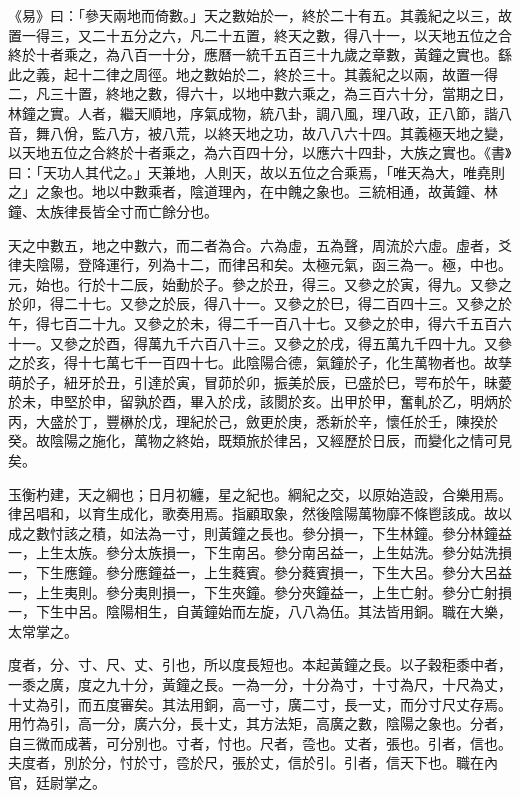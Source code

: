 \begin{pinyinscope}
《易》曰：「參天兩地而倚數。」天之數始於一，終於二十有五。其義紀之以三，故置一得三，又二十五分之六，凡二十五置，終天之數，得八十一，以天地五位之合終於十者乘之，為八百一十分，應曆一統千五百三十九歲之章數，黃鐘之實也。繇此之義，起十二律之周徑。地之數始於二，終於三十。其義紀之以兩，故置一得二，凡三十置，終地之數，得六十，以地中數六乘之，為三百六十分，當期之日，林鐘之實。人者，繼天順地，序氣成物，統八卦，調八風，理八政，正八節，諧八音，舞八佾，監八方，被八荒，以終天地之功，故八八六十四。其義極天地之變，以天地五位之合終於十者乘之，為六百四十分，以應六十四卦，大族之實也。《書》曰：「天功人其代之。」天兼地，人則天，故以五位之合乘焉，「唯天為大，唯堯則之」之象也。地以中數乘者，陰道理內，在中餽之象也。三統相通，故黃鐘、林鐘、太族律長皆全寸而亡餘分也。

天之中數五，地之中數六，而二者為合。六為虛，五為聲，周流於六虛。虛者，爻律夫陰陽，登降運行，列為十二，而律呂和矣。太極元氣，函三為一。極，中也。元，始也。行於十二辰，始動於子。參之於丑，得三。又參之於寅，得九。又參之於卯，得二十七。又參之於辰，得八十一。又參之於巳，得二百四十三。又參之於午，得七百二十九。又參之於未，得二千一百八十七。又參之於申，得六千五百六十一。又參之於酉，得萬九千六百八十三。又參之於戌，得五萬九千四十九。又參之於亥，得十七萬七千一百四十七。此陰陽合德，氣鐘於子，化生萬物者也。故孳萌於子，紐牙於丑，引達於寅，冒茆於卯，振美於辰，已盛於巳，咢布於午，昧薆於未，申堅於申，留孰於酉，畢入於戌，該閡於亥。出甲於甲，奮軋於乙，明炳於丙，大盛於丁，豐楙於戊，理紀於己，斂更於庚，悉新於辛，懷任於壬，陳揆於癸。故陰陽之施化，萬物之終始，既類旅於律呂，又經歷於日辰，而變化之情可見矣。

玉衡杓建，天之綱也；日月初纏，星之紀也。綱紀之交，以原始造設，合樂用焉。律呂唱和，以育生成化，歌奏用焉。指顧取象，然後陰陽萬物靡不條鬯該成。故以成之數忖該之積，如法為一寸，則黃鐘之長也。參分損一，下生林鐘。參分林鐘益一，上生太族。參分太族損一，下生南呂。參分南呂益一，上生姑洗。參分姑洗損一，下生應鐘。參分應鐘益一，上生蕤賓。參分蕤賓損一，下生大呂。參分大呂益一，上生夷則。參分夷則損一，下生夾鐘。參分夾鐘益一，上生亡射。參分亡射損一，下生中呂。陰陽相生，自黃鐘始而左旋，八八為伍。其法皆用銅。職在大樂，太常掌之。

度者，分、寸、尺、丈、引也，所以度長短也。本起黃鐘之長。以子穀秬黍中者，一黍之廣，度之九十分，黃鐘之長。一為一分，十分為寸，十寸為尺，十尺為丈，十丈為引，而五度審矣。其法用銅，高一寸，廣二寸，長一丈，而分寸尺丈存焉。用竹為引，高一分，廣六分，長十丈，其方法矩，高廣之數，陰陽之象也。分者，自三微而成著，可分別也。寸者，忖也。尺者，卺也。丈者，張也。引者，信也。夫度者，別於分，忖於寸，卺於尺，張於丈，信於引。引者，信天下也。職在內官，廷尉掌之。


\end{pinyinscope}
